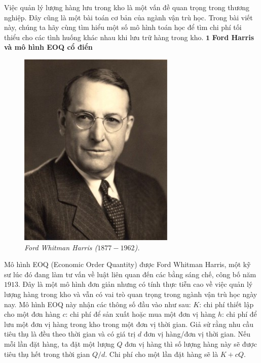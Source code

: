 \begin{multicols}{2}
	Việc quản lý lượng hàng lưu trong kho là một vấn đề quan trọng trong thương nghiệp. Đây cũng là một bài toán cơ bản của ngành vận trù học. Trong bài viết này, chúng ta hãy cùng tìm hiểu một số mô hình toán học để tìm chi phí tối thiểu cho các tình huống khác nhau khi lưu trữ hàng trong kho.
	\vskip 0.1cm
	$\pmb{1}$ \textbf{Ford Harris và mô hình EOQ cổ điển}
	\begin{figure}[H]
		\vspace*{-5pt}
		\centering
		\captionsetup{labelformat= empty, justification=centering}
		\includegraphics[width= 0.6\linewidth]{1}
		\caption{\small\textit{\color{toanhocdoisong}Ford Whitman Harris ($1877-1962$).}}
		\vspace*{-10pt}
	\end{figure}
	Mô hình EOQ (Economic Order Quantity) được Ford Whitman Harris, một kỹ sư lúc đó đang làm tư vấn về luật liên quan đến các bằng sáng chế, công bố năm $1913$. Đây là một mô hình đơn giản nhưng có tính thực tiễn cao về việc quản lý lượng hàng trong kho và vẫn có vai trò quan trọng trong ngành vận trù học ngày nay. 
	\vskip 0.1cm
	Mô hình EOQ này nhận các thông số đầu vào như sau:
	\vskip 0.1cm
	$K$: chi phí thiết lập cho một đơn hàng
	\vskip 0.1cm
	$c$: chi phí để sản xuất hoặc mua một đơn vị hàng
	\vskip 0.1cm
	$h$: chi phí để lưu một đơn vị hàng trong kho trong một đơn vị thời gian.
	\vskip 0.1cm
	Giả sử rằng nhu cầu tiêu thụ là đều theo thời gian và có giá trị $d$ đơn vị hàng/đơn vị thời gian. Nếu mỗi lần đặt hàng, ta đặt một lượng $Q$ đơn vị hàng thì số lượng hàng này sẽ được tiêu thụ hết trong thời gian $Q/d$. Chi phí cho một lần đặt hàng sẽ là $K+cQ$.

\end{multicols}
